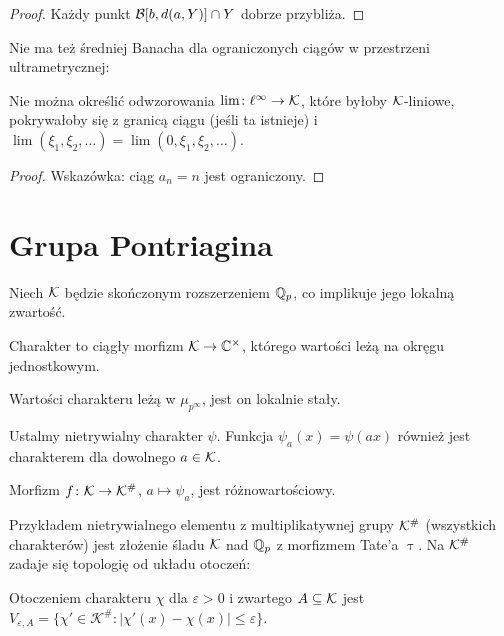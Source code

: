 \begin{proof}
	Każdy punkt $\mathcal B[b, d(a,Y)] \cap Y$ dobrze przybliża.
\end{proof}

Nie ma też średniej Banacha dla ograniczonych ciągów w przestrzeni ultrametrycznej:%

\begin{fakt}
	Nie można określić odwzorowania $\lim \colon \ell^\infty \to \mathcal K$, które byłoby $\mathcal K$-liniowe, pokrywałoby się z granicą ciągu (jeśli ta istnieje) i $\lim(\xi_1, \xi_2, \ldots) = \lim(0, \xi_1, \xi_2, \ldots)$.
\end{fakt}

\begin{proof}
	Wskazówka: ciąg $a_n = n$ jest ograniczony.
\end{proof}

\section{Grupa Pontriagina}
Niech $\mathcal K$ będzie skończonym rozszerzeniem $\mathbb Q_p$, co implikuje jego lokalną zwartość.

\begin{definicja}
	Charakter to ciągły morfizm $\mathcal K \to \mathbb C^\times$, którego wartości leżą na okręgu jednostkowym.
\end{definicja}

\begin{fakt}
	Wartości charakteru leżą w $\mu_{p^\infty}$, jest on lokalnie stały.
\end{fakt}

Ustalmy nietrywialny charakter $\psi$.
Funkcja $\psi_a(x) = \psi(ax)$ również jest charakterem dla dowolnego $a \in \mathcal K$.

\begin{fakt}
	Morfizm $f \colon \mathcal K \to \mathcal K^\#$, $a \mapsto \psi_a$, jest różnowartościowy.
\end{fakt}

Przykładem nietrywialnego elementu z multiplikatywnej grupy $\mathcal K^\#$ (wszystkich charakterów) jest złożenie śladu $\mathcal K$ nad $\mathbb Q_p$ z morfizmem Tate'a $\uptau$.
Na $\mathcal K^\#$ zadaje się topologię od układu otoczeń:

\begin{definicja}
	Otoczeniem charakteru $\chi$ dla $\varepsilon > 0$ i zwartego $A \subseteq \mathcal K$ jest $V_{\varepsilon, A} = \{\chi' \in \mathcal K^\#: |\chi'(x) - \chi(x)| \le \varepsilon\}$.
\end{definicja}

